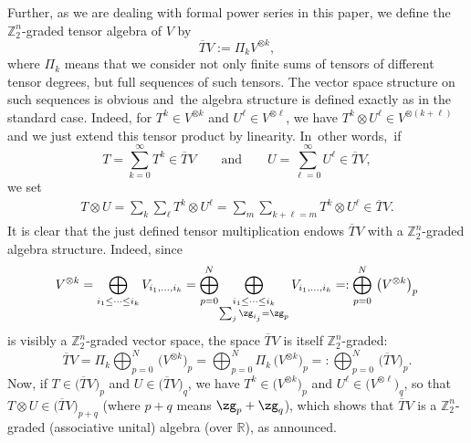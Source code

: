 \documentclass[pdftex]{sigma}%
\newcommand{\R}{{\mathbb R}}
\newcommand{\Z}{{\mathbb Z}}
\newcommand{\0}{\otimes}
\numberwithin{equation}{section}
\begin{document}
Further, as we are dealing with formal power series in this paper, we define the $\Z_2^n$-graded tensor algebra of $V$ by
\[
\overline{T}V:=\Pi_k V^{\0 k},
\]
where $\Pi_k$ means that we consider not only finite sums of tensors of different tensor degrees, but full sequences of such tensors. The vector space structure on such sequences is obvious and~the algebra structure is defined exactly as in the standard case. Indeed, for $T^k\in V^{\0 k}$ and $U^\ell\in V^{\0 \ell}$, we have $T^k\0 U^\ell\in V^{\0(k+\ell)}$ and we just extend this tensor product by linearity. In~other words,~if
\[
T=\sum_{k=0}^\infty T^k\in\overline{T}V\qquad\text{and}\qquad U=\sum_{\ell=0}^{\infty}U^\ell\in\overline{T}V,
\]
we set
\begin{gather}\label{TenMult}
T\0 U=\sum_k\sum_\ell T^k\0 U^\ell=\sum_m\sum_{k+\ell=m}T^k\0 U^\ell\in \overline{T}V.
\end{gather}
It is clear that the just defined tensor multiplication endows $\overline{T}V$ with a $\Z_2^n$-graded algebra structure. Indeed, since
\[
V^{\0 k}=\bigoplus_{i_1\le\cdots\le i_k}V_{i_1,\dots, i_k}=\bigoplus_{p=0}^N\!\bigoplus_{
\substack{i_1\le\cdots\le i_k \\ \sum_j\zg_{i_j}=\zg_p}}V_{i_1,\dots, i_k}=:\bigoplus_{p=0}^N\,\big(V^{\0 k}\big)_p
\]
is visibly a $\Z_2^n$-graded vector space, the space $\overline{T}V$ is itself $\Z_2^n$-graded:
\[
\overline{T}V=\Pi_k\bigoplus_{p=0}^N\,\big(V^{\0 k}\big)_p=\bigoplus_{p=0}^N\Pi_k\,\big(V^{\0 k}\big)_p=:\bigoplus_{p=0}^N\,\big(\overline{T}V\big)_p.
\]
Now, if $T\in\big(\overline{T}V\big)_p$ and $U\in\big(\overline{T}V\big)_q$, we have $T^k\in\big(V^{\0 k}\big)_p$ and $U^\ell\in\big(V^{\0 \ell}\big)_q$, so that $T\0 U\in\big(\overline{T}V\big)_{p+q}$ (where $p+q$ means $\zg_p+\zg_q$), which shows that $\overline{T}V$ is a $\Z_2^n$-graded (associative unital) algebra (over $\R$), as announced.
\end{document}
